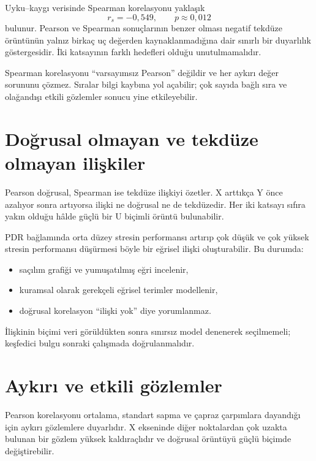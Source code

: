 Uyku--kaygı verisinde Spearman korelasyonu yaklaşık
\[
r_s=-0{,}549,
\qquad p\approx0{,}012
\]
bulunur. Pearson ve Spearman sonuçlarının benzer olması negatif tekdüze
örüntünün yalnız birkaç uç değerden kaynaklanmadığına dair sınırlı bir
duyarlılık göstergesidir. İki katsayının farklı hedefleri olduğu unutulmamalıdır.

\begin{mistakebox}
Spearman korelasyonu ``varsayımsız Pearson'' değildir ve her aykırı değer
sorununu çözmez. Sıralar bilgi kaybına yol açabilir; çok sayıda bağlı sıra ve
olağandışı etkili gözlemler sonucu yine etkileyebilir.
\end{mistakebox}

\section{Doğrusal olmayan ve tekdüze olmayan ilişkiler}

Pearson doğrusal, Spearman ise tekdüze ilişkiyi özetler. X arttıkça Y önce
azalıyor sonra artıyorsa ilişki ne doğrusal ne de tekdüzedir. Her iki katsayı
sıfıra yakın olduğu hâlde güçlü bir U biçimli örüntü bulunabilir.

PDR bağlamında orta düzey stresin performansı artırıp çok düşük ve çok yüksek
stresin performansı düşürmesi böyle bir eğrisel ilişki oluşturabilir. Bu
durumda:

\begin{itemize}
  \item saçılım grafiği ve yumuşatılmış eğri incelenir,
  \item kuramsal olarak gerekçeli eğrisel terimler modellenir,
  \item doğrusal korelasyon ``ilişki yok'' diye yorumlanmaz.
\end{itemize}

İlişkinin biçimi veri görüldükten sonra sınırsız model denenerek seçilmemeli;
keşfedici bulgu sonraki çalışmada doğrulanmalıdır.

\section{Aykırı ve etkili gözlemler}

Pearson korelasyonu ortalama, standart sapma ve çapraz çarpımlara dayandığı
için aykırı gözlemlere duyarlıdır. X ekseninde diğer noktalardan çok uzakta
bulunan bir gözlem yüksek kaldıraçlıdır ve doğrusal örüntüyü güçlü biçimde
değiştirebilir.

